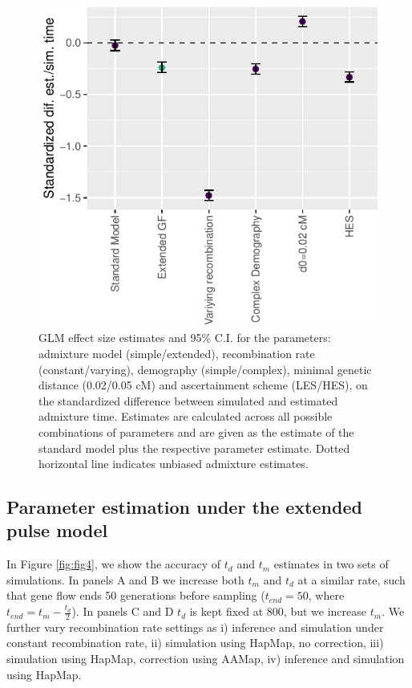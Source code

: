 \documentclass[]{article}
\begin{document}
\begin{figure}
\centering
\includegraphics{Admixture_Time_Inference_Paper_Draft_files/figure-latex/fig3-1.pdf}
\caption{\label{fig:fig3} GLM effect size estimates and 95\% C.I. for the parameters: admixture model (simple/extended), recombination rate (constant/varying), demography (simple/complex), minimal genetic distance (0.02/0.05 cM) and ascertainment scheme (LES/HES), on the standardized difference between simulated and estimated admixture time. Estimates are calculated across all possible combinations of parameters and are given as the estimate of the standard model plus the respective parameter estimate. Dotted horizontal line indicates unbiased admixture estimates.}
\end{figure}


\subsection{Parameter estimation under the extended pulse model}\label{estimating the Lomax-parameters under different conditions}
In Figure \ref{fig:fig4}, we show the accuracy of $t_d$ and $t_m$ estimates in two sets of simulations. In panels A and B we increase both $t_m$ and $t_d$ at a similar rate, such that gene flow ends 50 generations before sampling ($t_{end}=50$, where $t_{end}= t_m - \frac{t_d}{2}$). In panels C and D $t_d$ is kept fixed at 800, but we increase $t_m$. We further vary recombination rate settings as i) inference and simulation under constant recombination rate, ii) simulation using HapMap, no correction, iii) simulation using HapMap, correction using AAMap, iv) inference and simulation using HapMap. 
\end{document}

